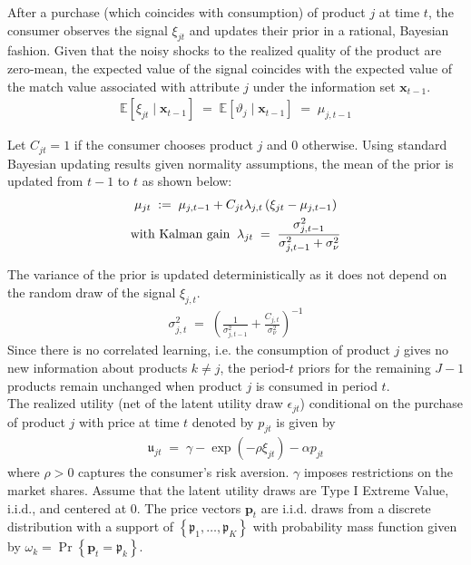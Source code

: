 \documentclass[11pt]{article}
\newcommand{\E}{\mathbb{E}}
\begin{document}
\noindent After a purchase (which coincides with consumption) of product $j$ at time $t$, the consumer observes the signal $\xi_{j t}$ and updates their prior in a rational, Bayesian fashion. Given that the noisy shocks to the realized quality of the product are zero-mean, the expected value of the signal coincides with the expected value of the match value associated with attribute $j$ under the information set $\boldsymbol{x}_{t-1}$.
\begin{gather*}
    \E\left[\xi_{jt} \mid \boldsymbol{x}_{t-1} \right] \; = \; \E\left[\vartheta_{j} \mid \boldsymbol{x}_{t-1} \right] \; = \; \mu_{j,t-1}
\end{gather*}

\noindent Let $C_{jt} = 1$ if the consumer chooses product $j$ and $0$ otherwise. Using standard Bayesian updating results given normality assumptions, the mean of the prior is updated from $t-1$ to $t$ as shown below:
\begin{gather}
    \mu_{jt} \; := \;   \mu_{j,t-1}+ C_{jt} \lambda_{j,t} \left( \xi_{jt} - \mu_{j,t-1}  \right)  \label{eq:bayes-mean} \\
\text{with Kalman gain} \;\; 
\lambda_{jt} \; = \; \frac{\sigma^2_{j,t-1}}{\sigma^2_{j,t-1} + \sigma^2_{\nu}} \notag
\end{gather}

\noindent The variance of the prior is updated deterministically as it does not depend on the random draw of the signal $\xi_{j,t}$.
\begin{gather}
    \sigma^2_{j,t} \; = \; {\left(\frac{1}{\sigma^2_{j,t-1}} + \frac{C_{j,t}}{\sigma^2_{\nu}} \right)}^{-1} \label{eq:bayes-var}
\end{gather}
\noindent Since there is no correlated learning, i.e. the consumption of product $j$ gives no new information about products $k \neq j$, the period-$t$ priors for the remaining $J - 1$ products remain unchanged when product $j$ is consumed in period $t$.\\

\noindent The realized utility (net of the latent utility draw $\epsilon_{j t}$) conditional on the purchase of product $j$ with price at time $t$ denoted by $p_{j t}$ is given by
\begin{gather*}
\mathfrak{u}_{j t} \; = \; \gamma-\exp \left(-\rho \xi_{j t}\right)-\alpha p_{j t}
\end{gather*}
\noindent where $\rho > 0$ captures the consumer's risk aversion. $\gamma$ imposes restrictions on the market shares. Assume that the latent utility draws are Type I Extreme Value, i.i.d., and centered at 0. The price vectors $\mathbf{p}_{t}$ are i.i.d. draws from a discrete distribution with a support of $\left\{\boldsymbol{\mathfrak{p}}_{1}, \ldots, \boldsymbol{\mathfrak{p}}_{K}\right\}$ with probability mass function given by $\omega_{k}=\operatorname{Pr}\left\{\boldsymbol{p}_{t}=\boldsymbol{\mathfrak{p}}_{k}\right\}$.\\
\end{document}
